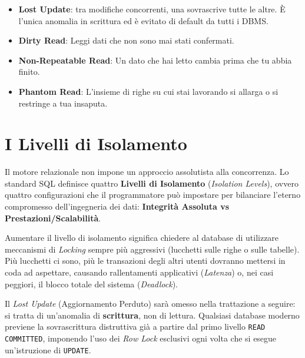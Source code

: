 \begin{tip}

    \begin{itemize}
        \item \textbf{Lost Update}: tra modifiche concorrenti, una sovrascrive tutte le altre. È l'unica anomalia in scrittura ed è evitato di default da tutti i DBMS.  
        
        \item \textbf{Dirty Read}: Leggi dati che non sono mai stati confermati.

        \item \textbf{Non-Repeatable Read}: Un dato che hai letto cambia prima che tu abbia finito.
        
        \item \textbf{Phantom Read}: L'insieme di righe su cui stai lavorando si allarga o si restringe a tua insaputa.
    \end{itemize}
    
\end{tip}

\section{I Livelli di Isolamento}

Il motore relazionale non impone un approccio assolutista alla concorrenza. Lo standard SQL definisce quattro \textbf{Livelli di Isolamento} (\textit{Isolation Levels}), ovvero quattro configurazioni che il programmatore può impostare per bilanciare l'eterno compromesso dell'ingegneria dei dati: \textbf{Integrità Assoluta vs Prestazioni/Scalabilità}.

Aumentare il livello di isolamento significa chiedere al database di utilizzare meccanismi di \textit{Locking} sempre più aggressivi (lucchetti sulle righe o sulle tabelle). Più lucchetti ci sono, più le transazioni degli altri utenti dovranno mettersi in coda ad aspettare, causando rallentamenti applicativi (\textit{Latenza}) o, nei casi peggiori, il blocco totale del sistema (\textit{Deadlock}).

Il \textit{Lost Update} (Aggiornamento Perduto) sarà omesso nella trattazione a seguire: si tratta di un'anomalia di \textbf{scrittura}, non di lettura. Qualsiasi database moderno previene la sovrascrittura distruttiva già a partire dal primo livello \texttt{READ COMMITTED}, imponendo l'uso dei \textit{Row Lock} esclusivi ogni volta che si esegue un'istruzione di \texttt{UPDATE}.

